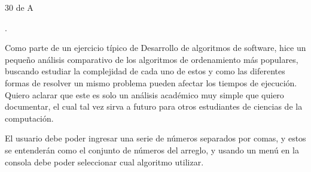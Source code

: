 \documentclass[12pt]{article}
\begin{document}
\begin{adjustwidth}{2.08in}{2.08in}
\begin{Center}
30 de A
\end{Center}\par

\end{adjustwidth}


\vspace{\baselineskip}

\vspace{\baselineskip}
\begin{adjustwidth}{0.07in}{0.05in}
\begin{justify}
{\fontsize{11pt}{13.2pt}\selectfont .\par}
\end{justify}\par

\end{adjustwidth}

\begin{adjustwidth}{0.07in}{0.05in}
\begin{justify}
{\fontsize{11pt}{13.2pt}\selectfont Como parte de un ejercicio típico de Desarrollo de algoritmos de software, hice un pequeño análisis comparativo de los algoritmos de ordenamiento más populares, buscando estudiar la complejidad de cada uno de estos y como las diferentes formas de resolver un mismo problema pueden afectar los tiempos de ejecución. Quiero aclarar que este es solo un análisis académico muy simple que quiero documentar, el cual tal vez sirva a futuro para otros estudiantes de ciencias de la computación.\par}
\end{justify}\par

\end{adjustwidth}


\vspace{\baselineskip}
\begin{adjustwidth}{0.07in}{0.05in}
\begin{justify}
{\fontsize{11pt}{13.2pt}\selectfont El usuario debe poder ingresar una serie de números separados por comas, y estos se entenderán como el conjunto de números del arreglo, y usando un menú en la consola debe poder seleccionar cual algoritmo utilizar.\par}
\end{justify}\par

\end{adjustwidth}
\end{document}

